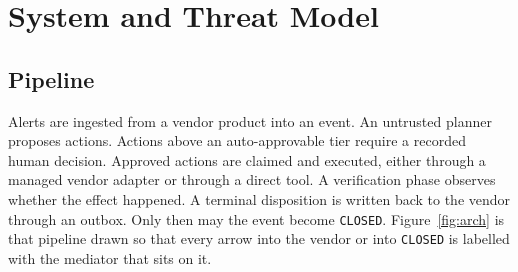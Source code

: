 \documentclass[acmsmall,manuscript,review,anonymous]{acmart}
\renewcommand{\_}{\discretionary{\textunderscore}{}{\textunderscore}}
\begin{document}
\section{System and Threat Model}
\label{sec:threat}

\subsection{Pipeline}

Alerts are ingested from a vendor product into an event. An untrusted planner
proposes actions. Actions above an auto-approvable tier require a recorded human
decision. Approved actions are claimed and executed, either through a managed
vendor adapter or through a direct tool. A verification phase observes whether
the effect happened. A terminal disposition is written back to the vendor
through an outbox. Only then may the event become \texttt{CLOSED}.
Figure~\ref{fig:arch} is that pipeline drawn so that every arrow into the vendor
or into \texttt{CLOSED} is labelled with the mediator that sits on it.
\end{document}
